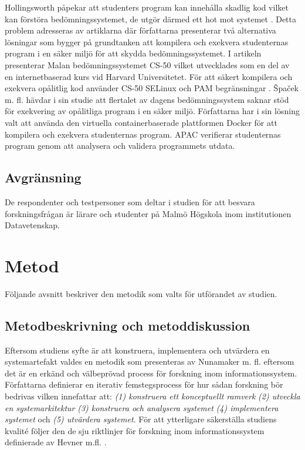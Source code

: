 \documentclass[a4paper,11pt]{article}
\begin{document}
{Hollingsworth påpekar att studenters program kan innehålla skadlig kod vilket kan förstöra bedömningssystemet, de utgör därmed ett hot mot systemet \cite{hollingsworth_2}. Detta problem adresseras av artiklarna \cite{spacek_13} \cite{cs50_8} \cite{ihantola} där författarna presenterar två alternativa lösningar som bygger på grundtanken att kompilera och exekvera studenternas program i en säker miljö för att skydda bedömningssystemet. I artikeln \cite{cs50_8} presenterar Malan bedömningssystemet CS-50 vilket utvecklades som en del av en internetbaserad kurs vid Harvard Universitetet. För att säkert kompilera och exekvera opålitlig kod använder CS-50 SELinux \cite{selinux} och PAM begränsningar \cite{pambegransningar}. Špaček m. fl. \cite{spacek_13} hävdar i sin studie att flertalet av dagens bedömningssystem saknar stöd för exekvering av opålitliga program i en säker miljö. Författarna har i sin lösning valt att använda den virtuella containerbaserade plattformen Docker \cite{docker} för att kompilera och exekvera studenternas program. APAC verifierar studenternas program genom att analysera och validera programmets utdata.

\subsection{Avgränsning}

De respondenter och testpersoner som deltar i studien för att besvara forskningsfrågan är lärare och studenter på Malmö Högskola inom institutionen Datavetenskap.


\newpage
\section{Metod}

Följande avsnitt beskriver den metodik som valts för utförandet av studien.

\subsection{Metodbeskrivning och metoddiskussion}

Eftersom studiens syfte är att konstruera, implementera och utvärdera en systemartefakt valdes en metodik som presenteras av Nunamaker m. fl. \cite{nunamaker} eftersom det är en erkänd och välbeprövad process för forskning inom informationssystem. Författarna definierar en iterativ femstegsprocess för hur sådan forskning bör bedrivas vilken innefattar att: \textit{(1) konstruera ett konceptuellt ramverk} \textit{(2) utveckla en systemarkitektur} \textit{(3) konstruera och analysera systemet} \textit{(4) implementera systemet} och \textit{(5) utvärdera systemet}. För att ytterligare säkerställa studiens kvalité följer den de sju riktlinjer för forskning inom informationssystem definierade av Hevner m.fl. \cite{hevner}. 

}
\end{document}
